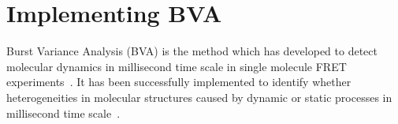 \section{Implementing BVA}


Burst Variance Analysis (BVA) is the method which has developed to detect molecular dynamics in millisecond time scale in single molecule FRET experiments~\cite{Torella_2011}. It has been successfully implemented to identify whether heterogeneities in molecular structures caused by dynamic or static processes in millisecond time scale~\cite{Torella_2011}\cite{Robb_2013}.
